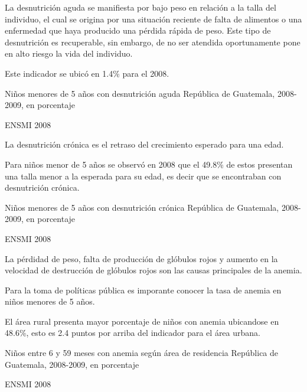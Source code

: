 
%
{%
	La desnutrición aguda se maniﬁesta por bajo peso en relación a la talla del individuo, el cual se origina por una situación reciente de falta de alimentos o una enfermedad que haya producido una pérdida rápida de peso. Este tipo de desnutrición es recuperable, sin embargo, de no ser atendida oportunamente pone en alto riesgo la vida del individuo.
	
	Este indicador se ubicó en 1.4\% para el 2008.
}%
{%
	Niños menores de 5 años con desnutrición aguda} %
{%
	República de Guatemala, 2008-2009, en porcentaje} %
{%
	\begin{tikzpicture}[x=1pt,y=1pt]    \end{tikzpicture}}%
{%
	ENSMI 2008} %



%
{%
	La desnutrición crónica es el retraso del crecimiento esperado para una edad. 
	
	Para niños menor de 5 años se observó en 2008 que el 49.8\% de estos presentan una talla menor a la esperada para su edad, es decir que se encontraban con desnutrición crónica. 
}%
{%
	Niños menores de 5 años con desnutrición crónica} %
{%
	República de Guatemala, 2008-2009, en porcentaje} %
{%
	\begin{tikzpicture}[x=1pt,y=1pt]    \end{tikzpicture}}%
{%
	ENSMI 2008} %



%
{%
	La pérdidad de peso, falta de producción de glóbulos rojos y aumento en la velocidad de destrucción de glóbulos rojos son las causas principales de la anemia. 
	
	Para la toma de políticas pública es imporante conocer la tasa de anemia en niños menores de 5 años. 
	
	El área rural presenta mayor porcentaje de niños con anemia ubicandose en 48.6\%, esto es 2.4 puntos por arriba del indicador para el área urbana. 
	
	}%
{%
	Niños entre 6 y 59 meses con anemia según área de residencia} %
{%
	República de Guatemala, 2008-2009, en porcentaje} %
{%
	\begin{tikzpicture}[x=1pt,y=1pt]    \end{tikzpicture}}%
{%
	ENSMI 2008} %

